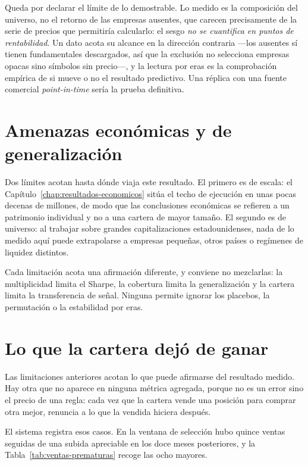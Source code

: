 Queda por declarar el límite de lo demostrable. Lo medido es la composición del universo,
no el retorno de las empresas ausentes, que carecen precisamente de la serie de precios que
permitiría calcularlo: el sesgo \emph{no se cuantifica en puntos de rentabilidad}. Un dato acota su
alcance en la dirección contraria ---los ausentes sí tienen fundamentales descargados, así que la
exclusión no selecciona empresas opacas sino símbolos sin precio---, y la lectura por eras es la
comprobación empírica de si mueve o no el resultado predictivo. Una réplica con una fuente comercial
\textit{point-in-time} sería la prueba definitiva.

\section{Amenazas económicas y de generalización}

Dos límites acotan hasta dónde viaja este resultado. El primero es de escala: el
Capítulo~\ref{chap:resultados-economicos} sitúa el techo de ejecución en unas pocas decenas de
millones, de modo que las conclusiones económicas se refieren a un patrimonio individual y no a una
cartera de mayor tamaño. El segundo es de universo: al trabajar sobre grandes capitalizaciones
estadounidenses, nada de lo medido aquí puede extrapolarse a empresas pequeñas, otros países o
regímenes de liquidez distintos.

Cada limitación acota una afirmación diferente, y conviene no mezclarlas: la multiplicidad limita el
Sharpe, la cobertura limita la generalización y la cartera limita la transferencia de señal. Ninguna
permite ignorar los placebos, la permutación o la estabilidad por eras.

\section{Lo que la cartera dejó de ganar}

Las limitaciones anteriores acotan lo que puede afirmarse del resultado medido. Hay otra que no
aparece en ninguna métrica agregada, porque no es un error sino el precio de una regla: cada vez que
la cartera vende una posición para comprar otra mejor, renuncia a lo que la vendida hiciera después.

El sistema registra esos casos. En la ventana de selección hubo quince ventas seguidas de una subida
apreciable en los doce meses posteriores, y la Tabla~\ref{tab:ventas-prematuras} recoge las ocho
mayores.

